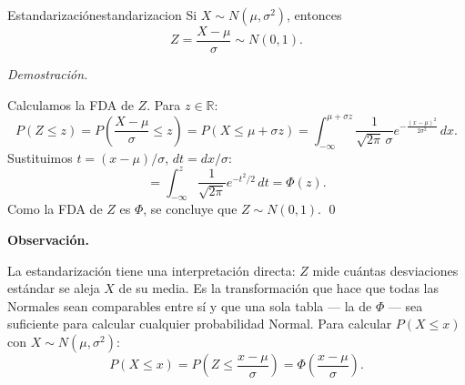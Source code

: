 \documentclass[12pt, a4paper]{book}
\newenvironment{observacion}{%
    \par\medskip\noindent\textbf{\color{azul}Observaci\'{o}n.}\enspace\itshape
}{\par\medskip}
\renewenvironment{proof}{%
    \par\medskip\noindent\textit{Demostraci\'{o}n.}\enspace
}{\qed\par\medskip}
\numberwithin{equation}{chapter}
\begin{document}
\begin{proposicion}{Estandarizaci\'{o}n}{estandarizacion}
	Si $X \sim N(\mu, \sigma^2)$, entonces
	\[
	Z = \frac{X - \mu}{\sigma} \sim N(0,1).
	\]
\end{proposicion}

\begin{proof}
	Calculamos la FDA de $Z$. Para $z \in \mathbb{R}$:
	\[
	P(Z \leq z) = P\!\left(\frac{X-\mu}{\sigma} \leq z\right)
	= P(X \leq \mu + \sigma z)
	= \int_{-\infty}^{\mu+\sigma z}
	\frac{1}{\sqrt{2\pi}\,\sigma}
	e^{-\frac{(x-\mu)^2}{2\sigma^2}}\,dx.
	\]
	Sustituimos $t = (x-\mu)/\sigma$, $dt = dx/\sigma$:
	\[
	= \int_{-\infty}^{z} \frac{1}{\sqrt{2\pi}}
	e^{-t^2/2}\,dt = \Phi(z).
	\]
	Como la FDA de $Z$ es $\Phi$, se concluye que
	$Z \sim N(0,1)$. \qedhere
\end{proof}

\begin{observacion}
	La estandarización tiene una interpretación directa: $Z$
	mide cuántas desviaciones estándar se aleja $X$ de su
	media. Es la transformación que hace que todas las Normales
	sean comparables entre sí y que una sola tabla --- la de
	$\Phi$ --- sea suficiente para calcular cualquier
	probabilidad Normal. Para calcular $P(X \leq x)$
	con $X \sim N(\mu,\sigma^2)$:
	\[
	P(X \leq x) = P\!\left(Z \leq \frac{x-\mu}{\sigma}\right)
	= \Phi\!\left(\frac{x-\mu}{\sigma}\right).
	\]
\end{observacion}
\end{document}
